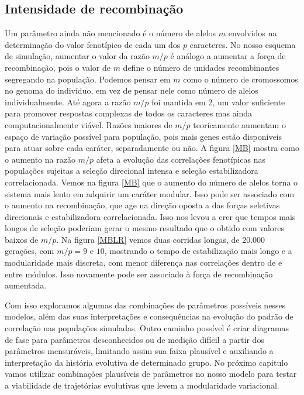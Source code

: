 \subsection{Intensidade de recombinação}

Um parâmetro ainda não mencionado é o número de alelos $m$ envolvidos na
determinação do valor fenotípico de cada um dos $p$ caracteres. 
No nosso esquema de simulação, aumentar o valor da razão $m/p$ é análogo
a aumentar a força de recombinação, pois o valor de $m$ define o número
de unidades recombinantes segregando na população. 
Podemos pensar em $m$ como o número de cromossomos no genoma do
indivíduo, em vez de pensar nele como número de alelos individualmente. 
Até agora a razão $m/p$ foi mantida em 2, um valor suficiente para
promover respostas complexas de todos os caracteres mas ainda
computacionalmente viável. 
Razões maiores de $m/p$ teoricamente aumentam o espaço de variação
possível para população, pois mais genes estão disponíveis para atuar
sobre cada caráter, separadamente ou não. 
A figura \ref{MB} mostra como o aumento na razão $m/p$ afeta a evolução
das correlações fenotípicas nas populações sujeitas a seleção direcional
intensa e seleção estabilizadora correlacionada. 
Vemos na figura \ref{MB} que o aumento do número de alelos torna o
sistema mais lento em adquirir um caráter modular. 
Isso pode ser associado com o aumento na recombinação, que age na
direção oposta a das forças seletivas direcionais e estabilizadora
correlacionada. 
Isso nos levou a crer que tempos mais longos de seleção poderiam gerar o
mesmo resultado que o obtido com valores baixos de $m/p$. 
Na figura \ref{MBLR} vemos duas corridas longas, de 20.000 gerações, com
$m/p = 9$ e $10$, mostrando o tempo de estabilização mais longo e a
modularidade mais discreta, com menor diferença nas correlações dentro
de e entre módulos. 
Isso novamente pode ser associado à força de recombinação aumentada. 

Com isso exploramos algumas das combinações de parâmetros possíveis
nesses modelos, além das suas interpretações e consequências na evolução
do padrão de correlação nas populações simuladas. 
Outro caminho possível é criar diagramas de fase para parâmetros
desconhecidos ou de medição difícil a partir dos parâmetros mensuráveis, 
limitando assim sua faixa plausível e auxiliando a interpretação da
história evolutiva de determinado grupo. 
No próximo capitulo vamos utilizar combinações plausíveis de parâmetros
no nosso modelo para testar a viabilidade de trajetórias evolutivas que
levem a modularidade variacional. 

